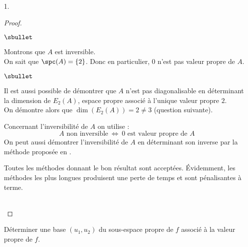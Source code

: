 \documentclass[11pt]{article}%
\begin{document}
\begin{noliste}{1.}
\begin{proof}
\begin{noliste}{$\sbullet$}
      \item Montrons que $A$ est inversible.\\
	On sait que $\spc(A) = \{2\}$. Donc en particulier, $0$ n'est
        pas valeur propre de $A$. %
      \end{noliste}
    \begin{remark}%
      \begin{noliste}{$\sbullet$}
      \item Il est aussi possible de démontrer que $A$ n'est pas
        diagonalisable en déterminant la dimension de $E_2(A)$,
        espace propre associé à l'unique valeur propre $2$.\\
        On démontre alors que $\dim(E_2(A)) = 2 \neq 3$ (\cf question
        suivante).
      \item Concernant l'inversibilité de $A$ on utilise :
        \[
        \mbox{$A$ non inversible} \ \Leftrightarrow \ \mbox{$0$ est
          valeur propre de $A$}
        \]
        On peut aussi démontrer l'inversibilité de $A$ en déterminant
        son inverse par la méthode proposée en .
      \item Toutes les méthodes donnant le bon résultat sont
        acceptées. Évidemment, les méthodes les plus longues
        produisent une perte de temps et sont pénalisantes à terme.
      \end{noliste}
    \end{remark}~\\[-1.2cm]
  \end{proof}		

\item Déterminer une base $(u_{1},u_{2})$ du sous-espace propre de $f$
  associé à la valeur propre de $f$.


\end{noliste}
\end{document}
